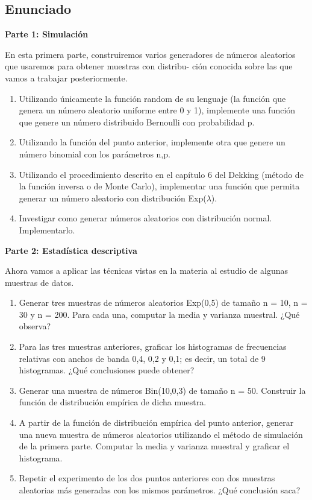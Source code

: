 \documentclass[11pt]{article}
\begin{document}
\subsection{Enunciado}

{\textbf{Parte 1: Simulación}}

En esta primera parte, construiremos varios generadores de números aleatorios que usaremos para obtener muestras con distribu-
ción conocida sobre las que vamos a trabajar posteriormente.
\begin{enumerate}
\item Utilizando únicamente la función random de su lenguaje (la función que genera un número aleatorio uniforme entre 0 y 1), implemente una función que genere un número distribuido Bernoulli con probabilidad p.
\item Utilizando la función del punto anterior, implemente otra que genere un número binomial con los parámetros n,p.
\item Utilizando el procedimiento descrito en el capítulo 6 del Dekking (método de la función inversa o de Monte Carlo), implementar una función que permita generar un número aleatorio con distribución Exp($\lambda$).
\item Investigar como generar números aleatorios con distribución normal. Implementarlo.
\end{enumerate}

{\textbf{Parte 2: Estadística descriptiva}}

Ahora vamos a aplicar las técnicas vistas en la materia al estudio de algunas muestras de datos.
\begin{enumerate}
\item Generar tres muestras de números aleatorios Exp(0,5) de tamaño n = 10, n = 30 y n = 200. Para cada una, computar la media y varianza muestral. ¿Qué observa?
\item Para las tres muestras anteriores, graficar los histogramas de frecuencias relativas con anchos de banda 0,4, 0,2 y 0,1; es decir, un total de 9 histogramas. ¿Qué conclusiones puede obtener?
\item Generar una muestra de números Bin(10,0,3) de tamaño n = 50. Construir la función de distribución empírica de dicha muestra.
\item A partir de la función de distribución empírica del punto anterior, generar una nueva muestra de números aleatorios utilizando el método de simulación de la primera parte. Computar la media y varianza muestral y graficar el histograma.
\item Repetir el experimento de los dos puntos anteriores con dos muestras aleatorias más generadas con los mismos parámetros. ¿Qué conclusión saca?
\end{enumerate}
\end{document}

